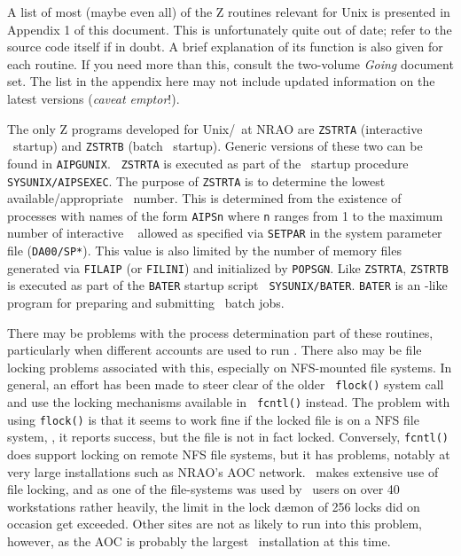 A list of most (maybe even all) of the Z routines relevant for Unix is
presented in Appendix 1 of this document.  This is unfortunately quite
out of date; refer to the source code itself if in doubt.  A brief
explanation of its function is also given for each routine.  If you need
more than this, consult the two-volume {\it Going \AIPS\/} document set.
The list in the appendix here may not include updated information on the
latest versions ({\it caveat emptor\/}!).
\medskip


The only Z programs developed for Unix/\AIPS\ at NRAO are {\tt ZSTRTA}
(interactive \AIPS\ startup) and {\tt ZSTRTB} (batch \AIPS\ startup).
Generic versions of these two can be found in {\tt \dol AIPGUNIX}.  {\tt
ZSTRTA} is executed as part of the \AIPS\ startup procedure
{\tt\dol SYSUNIX/AIPSEXEC}.  The purpose of {\tt ZSTRTA} is to determine
the lowest available/appropriate \POPS\ number.  This is determined from
the existence of processes with names of the form {\tt AIPSn} where
{\tt n} ranges from 1 to the maximum number of interactive \AIPS~
allowed as specified via {\tt SETPAR} in the system parameter file
({\tt \dol DA00/SP*}).  This value is also limited by the number of
memory files generated via {\tt FILAIP} (or {\tt FILINI}) and
initialized by {\tt POPSGN}.  Like {\tt ZSTRTA}, {\tt ZSTRTB} is
executed as part of the {\tt BATER} startup script {\tt
\dol SYSUNIX/BATER}.  {\tt BATER} is an \AIPS-like program for preparing
and submitting \AIPS\ batch jobs.

There may be problems with the process determination part of these
routines, particularly when different accounts are used to run \AIPS.
There also may be file locking problems associated with this, especially
on NFS-mounted file systems.
In general, an effort has been made to steer clear of the older {\tt
flock()} system call and use the locking mechanisms available in {\tt
fcntl()} instead.  The problem with using {\tt flock()} is that it seems
to work fine if the locked file is on a NFS file system, \ie, it reports
success, but the file is not in fact locked.  Conversely, {\tt fcntl()}
does support locking on remote NFS file systems, but it has problems,
notably at very large installations such as NRAO's AOC network.
\AIPS\ makes extensive use of file locking, and as one of the
file-systems was used by \AIPS\ users on over 40 workstations rather
heavily, the limit in the lock d\ae mon of 256 locks did on occasion get
exceeded.  Other sites are not as likely to run into this problem,
however, as the AOC is probably the largest \AIPS\ installation at this
time.

